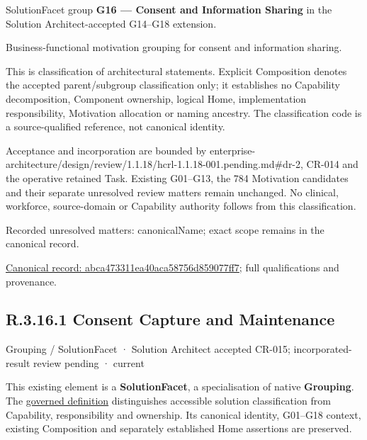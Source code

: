 SolutionFacet group \textbf{G16 — Consent and Information Sharing} in the Solution Architect-accepted G14–G18 extension.



Business-functional motivation grouping for consent and information sharing.



This is classification of architectural statements. Explicit Composition denotes the accepted parent/subgroup classification only; it establishes no Capability decomposition, Component ownership, logical Home, implementation responsibility, Motivation allocation or naming ancestry. The classification code is a source-qualified reference, not canonical identity.



Acceptance and incorporation are bounded by enterprise-architecture/design/review/1.1.18/hcrl-1.1.18-001.pending.md\#dr-2, CR-014 and the operative retained Task. Existing G01–G13, the 784 Motivation candidates and their separate unresolved review matters remain unchanged. No clinical, workforce, source-domain or Capability authority follows from this classification.


{\small Recorded unresolved matters: canonicalName; exact scope remains in the canonical record.}\par
{\footnotesize \href{../../../../../../../continuum/grouping/abca473311ea40aca58756d859077ff7.md}{Canonical record: abca473311ea40aca58756d859077ff7}; full qualifications and provenance.}\par
\subsection*{R.3.16.1 Consent Capture and Maintenance}
\label{navigation:R.3.16.1}

\label{element:884f06591f6c4dcf8e7f94e4b31269c1}
{\small Grouping / SolutionFacet · Solution Architect accepted CR-015; incorporated-result review pending · current}\par

This existing element is a \textbf{SolutionFacet}, a specialisation of native
\textbf{Grouping}. The \href{\detokenize{../../../../../../../governance/continuum-representation.md#solutionfacet-classification--1119-candidate}}{governed definition}
distinguishes accessible solution classification from Capability, responsibility
and ownership. Its canonical identity, G01–G18 context, existing Composition
and separately established Home assertions are preserved.



